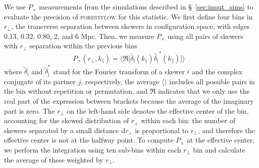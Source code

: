 \documentclass{aa}
\newcommand{\pcross}{$P_{\times}$\xspace}
\newcommand{\forestflow}{\textsc{forestflow}\xspace}
\begin{document}
We use \pcross measurements from the simulations described in \S~\ref{sec:input_sims} to evaluate the precision of \forestflow for this statistic. We first define four bins in $r_\perp$, the transverse separation between skewers in configuration space, with edges 0.13, 0.32, 0.80, 2, and 6 Mpc. Then, we measure \pcross using all pairs of skewers with $r_\perp$ separation within the previous bins 
%
\begin{equation}
    P_\times(r_\perp, k_\parallel) = \bigg \langle \Re \Big[\tilde{\delta_\mathrm{i}}(k_\parallel) \tilde{\delta_\mathrm{j}}^*(k_\parallel)\Big]\bigg\rangle \,
\end{equation}
%
where $\tilde{\delta}_\mathrm{i}$ and $\tilde{\delta}^*_\mathrm{j}$ stand for the Fourier transform of a skewer $i$ and the complex conjugate of its partner $j$, respectively, the average $\langle\rangle$ includes all possible pairs in the bin without repetition or permutation, and $\Re$ indicates that we only use the real part of the expression between brackets because the average of the imaginary part is zero. The $r_\perp$ on the left-hand side denotes the effective center of the bin, accounting for the skewed distribution of $r_\perp$ within each bin: the number of skewers separated by a small distance $\mathrm{d}r_\perp$ is proportional to $r_\perp$, and therefore the effective center is not at the halfway point. To compute \pcross at the effective center, we perform the integration using ten sub-bins within each $r_\perp$ bin and calculate the average of these weighted by $r_\perp$.
\end{document}
